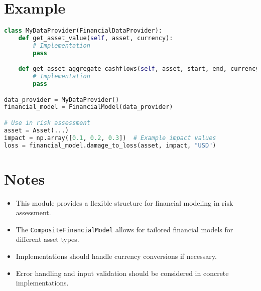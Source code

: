 \documentclass{article}
\begin{document}
\section{Example}

\begin{lstlisting}[language=Python]
class MyDataProvider(FinancialDataProvider):
    def get_asset_value(self, asset, currency):
        # Implementation
        pass

    def get_asset_aggregate_cashflows(self, asset, start, end, currency):
        # Implementation
        pass

data_provider = MyDataProvider()
financial_model = FinancialModel(data_provider)

# Use in risk assessment
asset = Asset(...)
impact = np.array([0.1, 0.2, 0.3])  # Example impact values
loss = financial_model.damage_to_loss(asset, impact, "USD")
\end{lstlisting}

\section{Notes}

\begin{itemize}
    \item This module provides a flexible structure for financial modeling in risk assessment.
    \item The \texttt{CompositeFinancialModel} allows for tailored financial models for different asset types.
    \item Implementations should handle currency conversions if necessary.
    \item Error handling and input validation should be considered in concrete implementations.
\end{itemize}
\end{document}
